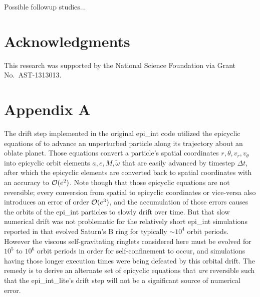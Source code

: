 \documentclass[preprint]{aastex62}
\begin{document}
Possible followup studies...

\acknowledgments
\section{Acknowledgments}
\label{sec:Acknowledgments}

This research was supported by the National Science Foundation via Grant No.\ AST-1313013.


\appendix

\section{Appendix A}
\label{sec:Appendix A}

The drift step implemented in the original epi\_int code utilized the epicyclic equations of \cite{BL94}
to advance an unperturbed particle along its trajectory about an oblate planet. Those equations
convert a particle's spatial coordinates $r, \theta, v_r, v_\theta$
into epicyclic orbit elements $a,e,M,\tilde{\omega}$ that are easily advanced by timestep
$\Delta t$, after which the epicyclic elements are converted back to spatial coordinates
with an accuracy to ${\cal O}(e^2)$. Note though that those epicyclic equations are not reversible;
every conversion from spatial to epicyclic coordinates or vice-versa also introduces an 
error of order ${\cal O}(e^3)$, and the accumulation of those errors causes the orbits of the epi\_int particles to 
slowly drift over time.  But that slow numerical drift
was not problematic for the relatively short epi\_int simulations reported in \cite{HS13} that evolved
Saturn's B ring for typically $\sim10^4$ orbit periods. However the viscous self-gravitating
ringlets considered here must be evolved for $10^5$ to $10^6$ orbit periods in order for self-confinement to occur,
and simulations having those longer execution times were being defeated by this orbital drift. 
The remedy is to derive an alternate set of epicyclic equations that
{\em are} reversible such that the epi\_int\_lite's drift step will not be a significant
source of numerical error.
\end{document}
